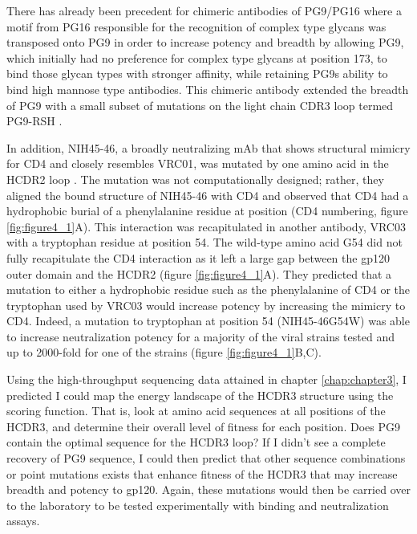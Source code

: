 There has already been precedent for chimeric antibodies of PG9/PG16 where a motif from PG16 responsible for the recognition of complex type glycans was transposed onto PG9 in order to increase potency and breadth by allowing PG9, which initially had no preference for complex type glycans at position 173, to bind those glycan types with stronger affinity, while retaining PG9s ability to bind high mannose type antibodies. This chimeric antibody extended the breadth of PG9 with a small subset of mutations on the light chain CDR3 loop termed PG9-RSH \citep{Pancera:2013ev}.

In addition, NIH45-46, a broadly neutralizing mAb that shows structural mimicry for CD4 and closely resembles VRC01, was mutated by one amino acid in the HCDR2 loop \citep{Scheid:2011js,Diskin:2011hl}. The mutation was not computationally designed; rather, they aligned the bound structure of NIH45-46 with CD4 and observed that CD4 had a hydrophobic burial of a phenylalanine residue at position (CD4 numbering, figure \ref{fig:figure4_1}A). This interaction was recapitulated in another antibody, VRC03 with a tryptophan residue at position 54. The wild-type amino acid G54 did not fully recapitulate the CD4 interaction as it left a large gap between the gp120 outer domain and the HCDR2 (figure \ref{fig:figure4_1}A). They predicted that a mutation to either a hydrophobic residue such as the phenylalanine of CD4 or the tryptophan used by VRC03 would increase potency by increasing the mimicry to CD4. Indeed, a mutation to tryptophan at position 54 (NIH45-46G54W) was able to increase neutralization potency for a majority of the viral strains tested and up to 2000-fold for one of the strains (figure \ref{fig:figure4_1}B,C).

Using the high-throughput sequencing data attained in chapter \ref{chap:chapter3}, I predicted I could map the energy landscape of the HCDR3 structure using the \rosetta scoring function. That is, look at amino acid sequences at all positions of the HCDR3, and determine their overall level of fitness for each position. Does PG9 contain the optimal sequence for the HCDR3 loop? If I didn't see a complete recovery of PG9 sequence, I could then predict that other sequence combinations or point mutations exists that enhance fitness of the HCDR3 that may increase breadth and potency to gp120. Again, these mutations would then be carried over to the laboratory to be tested experimentally with binding and neutralization assays.

